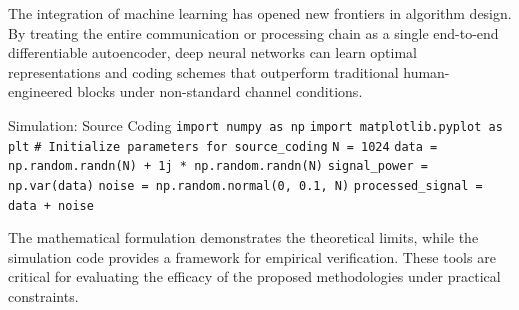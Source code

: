 The integration of machine learning has opened new frontiers in algorithm design. By treating the entire communication or processing chain as a single end-to-end differentiable autoencoder, deep neural networks can learn optimal representations and coding schemes that outperform traditional human-engineered blocks under non-standard channel conditions.

\begin{pythonbox}{Simulation: Source Coding}
\texttt{import numpy as np}
\texttt{import matplotlib.pyplot as plt}
\texttt{}
\texttt{\# Initialize parameters for source\_coding}
\texttt{N = 1024}
\texttt{data = np.random.randn(N) + 1j * np.random.randn(N)}
\texttt{signal\_power = np.var(data)}
\texttt{noise = np.random.normal(0, 0.1, N)}
\texttt{processed\_signal = data + noise}
\end{pythonbox}

\vspace{0.5cm}
The mathematical formulation demonstrates the theoretical limits, while the simulation code provides a framework for empirical verification. These tools are critical for evaluating the efficacy of the proposed methodologies under practical constraints.

